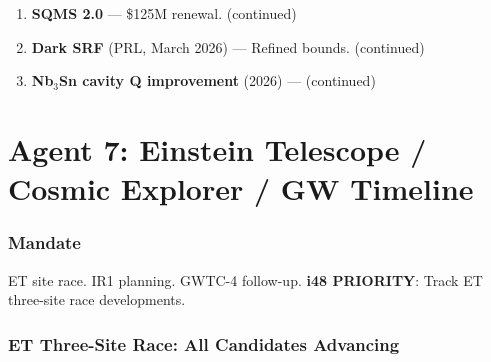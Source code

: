 \documentclass[11pt,a4paper]{article}
\begin{document}
\begin{enumerate}
\item \textbf{SQMS 2.0} --- \$125M renewal. (continued)
\item \textbf{Dark SRF} (PRL, March 2026) --- Refined bounds. (continued)
\item \textbf{Nb$_3$Sn cavity Q improvement} (2026) --- (continued)
\end{enumerate}


\part{Agent 7: Einstein Telescope / Cosmic Explorer / GW Timeline}
\label{part:agent7}

\section{Mandate}

ET site race. IR1 planning. GWTC-4 follow-up. \textbf{i48 PRIORITY}: Track ET three-site race developments.

\section{ET Three-Site Race: All Candidates Advancing}
\end{document}
